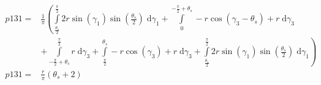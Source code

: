\begin{align}
    p131 =&\frac{1}{\pi} \left(\int\limits_{\frac{\theta_{s}}{2}}^{\frac{\pi}{2}}2 r \sin{\left (\gamma_{1} \right )} \sin{\left (\frac{\theta_{s}}{2} \right )}\;\mathrm{d}\gamma_{1}+\int\limits_{0}^{- \frac{\pi}{2} + \theta_{s}}- r \cos{\left (\gamma_{3} - \theta_{s} \right )} + r\;\mathrm{d}\gamma_{3}\right.\\
 &\left.+\int\limits_{- \frac{\pi}{2} + \theta_{s}}^{\frac{\pi}{2}}r\;\mathrm{d}\gamma_{3}+\int\limits_{\frac{\pi}{2}}^{\theta_{s}}- r \cos{\left (\gamma_{3} \right )} + r\;\mathrm{d}\gamma_{3}+\int\limits_{\frac{\theta_{s}}{2}}^{\frac{\pi}{2}}2 r \sin{\left (\gamma_{1} \right )} \sin{\left (\frac{\theta_{s}}{2} \right )}\;\mathrm{d}\gamma_{1}\right)\\
    p131 =& \frac{r}{\pi} \left(\theta_{s} + 2\right)
\end{align}